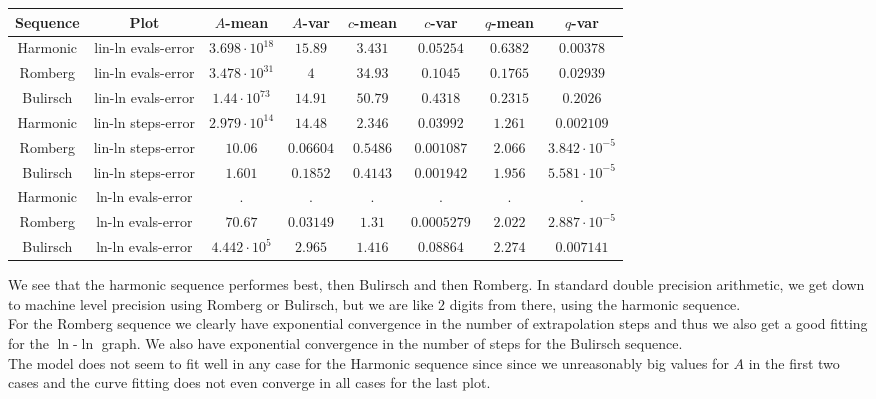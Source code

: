 \begin{table}[H]
    \centering
    \small
    \begin{tabular}{c|c||c|c|c|c|c	|c}
Sequence & Plot & \(A\)-mean & \(A\)-var & \(c\)-mean & \(c\)-var & \(q\)-mean & \(q\)-var\\\hline
Harmonic & lin-ln evals-error & \(3.698\cdot 10^{18}\) & \(15.89\) & \(3.431\) & \(0.05254\) & \(0.6382\) & \(0.00378\) \\
Romberg & lin-ln evals-error & \(3.478\cdot 10^{31}\) & \(4\) & \(34.93\) & \(0.1045\) & \(0.1765\) & \(0.02939\) \\
Bulirsch & lin-ln evals-error & \(1.44\cdot 10^{73}\) & \(14.91\) & \(50.79\) & \(0.4318\) & \(0.2315\) & \(0.2026\) \\
Harmonic & lin-ln steps-error & \(2.979\cdot 10^{14}\) & \(14.48\) & \(2.346\) & \(0.03992\) & \(1.261\) & \(0.002109\) \\
Romberg & lin-ln steps-error & \(10.06\) & \(0.06604\) & \(0.5486\) & \(0.001087\) & \(2.066\) & \(3.842\cdot 10^{-5}\) \\
Bulirsch & lin-ln steps-error & \(1.601\) & \(0.1852\) & \(0.4143\) & \(0.001942\) & \(1.956\) & \(5.581\cdot 10^{-5}\) \\
Harmonic & ln-ln evals-error & . & . & . & . & . & . \\
Romberg & ln-ln evals-error & \(70.67\) & \(0.03149\) & \(1.31\) & \(0.0005279\) & \(2.022\) & \(2.887\cdot 10^{-5}\) \\
Bulirsch & ln-ln evals-error & \(4.442\cdot 10^5\) & \(2.965\) & \(1.416\) & \(0.08864\) & \(2.274\) & \(0.007141\) \\
    \end{tabular}
    \label{tab:my_label}
\end{table}

We see that the harmonic sequence performes best, then Bulirsch and then Romberg. In standard double precision arithmetic, we get down to machine level precision using Romberg or Bulirsch, but we are like \(2\) digits from there, using the harmonic sequence.\\

For the Romberg sequence we clearly have exponential convergence in the number of extrapolation steps and thus we also get a good fitting for the \(\ln\)-\(\ln\) graph. We also have exponential convergence in the number of steps for the Bulirsch sequence.\\

The model does not seem to fit well in any case for the Harmonic sequence since since we unreasonably big values for \(A\) in the first two cases and the curve fitting does not even converge in all cases for the last plot.


